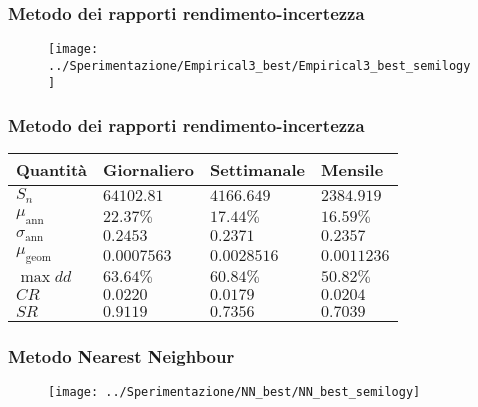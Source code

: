 \documentclass{beamer}
\theoremstyle{plain}
\theoremstyle{definition}
\theoremstyle{remark}
\begin{document}
\begin{frame}
\frametitle{Metodo dei rapporti rendimento-incertezza}
\begin{figure}
\centering
\texttt{[image: ../Sperimentazione/Empirical3\_best/Empirical3\_best\_semilogy]}
\caption{}
\label{fig:empirical3bestsemilogy}
\end{figure}

\end{frame}

\begin{frame}
\frametitle{Metodo dei rapporti rendimento-incertezza}
\begin{table}[H]
\centering
\begin{tabular}{|l|l|l|l|}
\hline
Quantità 			  & Giornaliero	 & Settimanale	& Mensile		\\\hline
$S_n$                 & $64102.81$   & $4166.649$	& $2384.919$ 	\\
$\mu_{\text{ann}}$    & $22.37\%$    & $17.44\%$	& $16.59\%$		\\
$\sigma_{\text{ann}}$ & $0.2453$     & $0.2371$		& $0.2357$		\\
$\mu_{\text{geom}}$   & $0.0007563$  & $0.0028516$	& $0.0011236$	\\
$\max dd$             & $63.64\%$    & $60.84\%$	& $50.82\%$		\\
$CR$                  & $0.0220$     & $0.0179$		& $0.0204$		\\
$SR$                  & $0.9119$     & $0.7356$		& $0.7039$		\\\hline
\end{tabular}
\end{table}
\end{frame}



\begin{frame}
\frametitle{Metodo Nearest Neighbour}
\begin{figure}
\centering
\texttt{[image: ../Sperimentazione/NN\_best/NN\_best\_semilogy]}
\caption{}
\label{fig:nnbestsemilogy}
\end{figure}

\end{frame}
\end{document}
